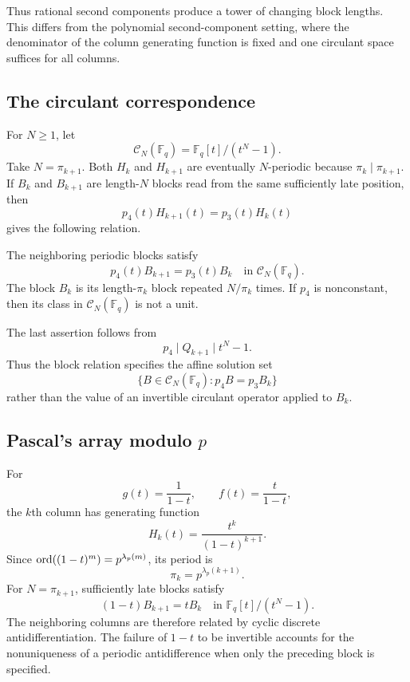 Thus rational second components produce a tower of changing block lengths.
This differs from the polynomial second-component setting, where the
denominator of the column generating function is fixed and one circulant
space suffices for all columns.

\subsection{The circulant correspondence}

For $N\geqslant1$, let
\[
\mathcal C_N(\mathbb F_q)=\mathbb F_q[t]/(t^N-1).
\]
Take $N=\pi_{k+1}$. Both $H_k$ and $H_{k+1}$ are eventually $N$-periodic
because $\pi_k\mid\pi_{k+1}$. If $B_k$ and $B_{k+1}$ are length-$N$ blocks
read from the same sufficiently late position, then
\[
p_4(t)H_{k+1}(t)=p_3(t)H_k(t)
\]
gives the following relation.

\begin{prop}\label{prop:q-block}
The neighboring periodic blocks satisfy
\[
p_4(t)B_{k+1}=p_3(t)B_k
\quad\text{in }\mathcal C_N(\mathbb F_q).
\]
The block $B_k$ is its length-$\pi_k$ block repeated $N/\pi_k$ times.
If $p_4$ is nonconstant, then its class in
$\mathcal C_N(\mathbb F_q)$ is not a unit.
\end{prop}

The last assertion follows from
\[
p_4\mid Q_{k+1}\mid t^N-1.
\]
Thus the block relation specifies the affine solution set
\[
\{B\in\mathcal C_N(\mathbb F_q):p_4B=p_3B_k\}
\]
rather than the value of an invertible circulant operator applied to $B_k$.

\subsection{Pascal's array modulo \texorpdfstring{$p$}{p}}

For
\[
g(t)=\frac{1}{1-t},
\qquad
f(t)=\frac{t}{1-t},
\]
the $k$th column has generating function
\[
H_k(t)=\frac{t^k}{(1-t)^{k+1}}.
\]
Since $\operatorname{ord}((1-t)^m)=p^{\lambda_p(m)}$, its period is
\[
\pi_k=p^{\lambda_p(k+1)}.
\]
For $N=\pi_{k+1}$, sufficiently late blocks satisfy
\[
(1-t)B_{k+1}=tB_k
\quad\text{in }\mathbb F_q[t]/(t^N-1).
\]
The neighboring columns are therefore related by cyclic discrete
antidifferentiation. The failure of $1-t$ to be invertible accounts for the
nonuniqueness of a periodic antidifference when only the preceding block is
specified.
